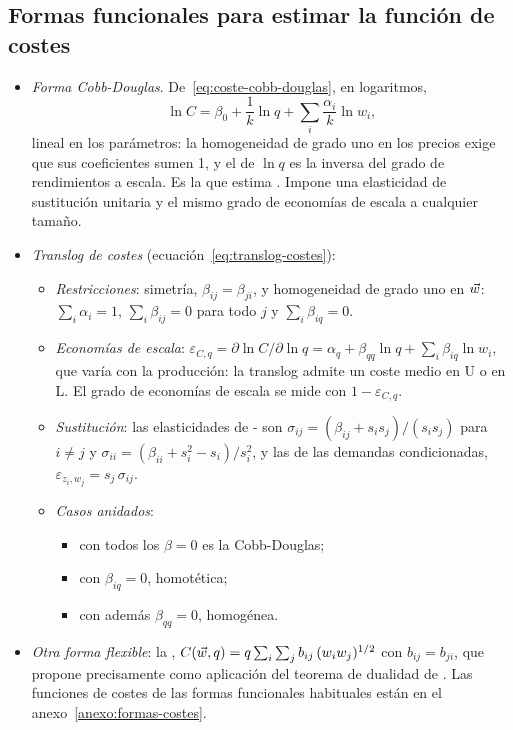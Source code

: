 \documentclass[11pt]{article}
\begin{document}
\subsection{Formas funcionales para estimar la función de costes}\label{anexo:empirica-formas}

\begin{itemize}
\item \emph{Forma Cobb-Douglas}. De~\eqref{eq:coste-cobb-douglas}, en logaritmos,
  \begin{equation}
  \ln C=\beta_0+\frac{1}{k}\ln q+\sum_i\frac{\alpha_i}{k}\ln w_i, \label{eq:coste-cd-log}
  \end{equation}
  lineal en los parámetros: la homogeneidad de grado uno en los precios exige que sus coeficientes sumen 1, y el de $\ln q$ es la inversa del grado de rendimientos a escala. Es la que estima \textcite{Nerlove1963Returns}. Impone una elasticidad de sustitución unitaria y el mismo grado de economías de escala a cualquier tamaño.
\item \emph{Translog de costes} (ecuación~\eqref{eq:translog-costes}):
  \begin{itemize}
  \item \emph{Restricciones}: simetría, $\beta_{ij}=\beta_{ji}$, y homogeneidad de grado uno en $\vec{w}$: $\sum_i\alpha_i=1$, $\sum_i\beta_{ij}=0$ para todo $j$ y $\sum_i\beta_{iq}=0$.
  \item \emph{Economías de escala}: $\varepsilon_{C,q}=\partial\ln C/\partial\ln q=\alpha_q+\beta_{qq}\ln q+\sum_i\beta_{iq}\ln w_i$, que varía con la producción: la translog admite un coste medio en U o en L. El grado de economías de escala se mide con $1-\varepsilon_{C,q}$.
  \item \emph{Sustitución}: las elasticidades de - son $\sigma_{ij}=(\beta_{ij}+s_is_j)/(s_is_j)$ para $i\neq j$ y $\sigma_{ii}=(\beta_{ii}+s_i^2-s_i)/s_i^2$, y las de las demandas condicionadas, $\varepsilon_{z_i,w_j}=s_j\,\sigma_{ij}$.
  \item \emph{Casos anidados}:
    \begin{itemize}
    \item con todos los $\beta=0$ es la Cobb-Douglas;
    \item con $\beta_{iq}=0$, homotética;
    \item con además $\beta_{qq}=0$, homogénea.
    \end{itemize}
  \end{itemize}
\item \emph{Otra forma flexible}: la , $C(\vec{w},q)=q\sum_i\sum_jb_{ij}\,(w_iw_j)^{1/2}$ con $b_{ij}=b_{ji}$, que \textcite{Diewert1971Application} propone precisamente como aplicación del teorema de dualidad de . Las funciones de costes de las formas funcionales habituales están en el anexo~\ref{anexo:formas-costes}.
\end{itemize}
\end{document}
